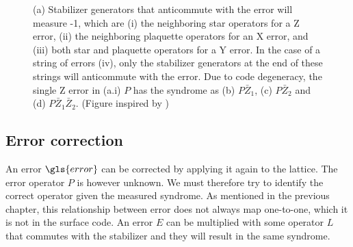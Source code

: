 \begin{figure}
  \hspace{1cm}
  \caption{(a) Stabilizer generators that anticommute with the error will measure -1, which are (i) the neighboring star operators for a Z error, (ii) the neighboring plaquette operators for an X error, and (iii) both star and plaquette operators for a Y error. In the case of a string of errors (iv), only the stabilizer generators at the end of these strings will anticommute with the error. Due to code degeneracy, the single Z error in (a.i) $P$ has the syndrome as (b) $P\bar{Z}_1$, (c) $P\bar{Z}_2$ and (d) $P\bar{Z}_1\bar{Z}_2$. (Figure inspired by \cite{browne})}\label{sf:fig_degenerate}
\end{figure}

\subsection{Error correction}
An error $\gls{error}$ can be corrected by applying it again to the lattice. The error operator $P$ is however unknown. We must therefore try to identify the correct operator given the measured syndrome. As mentioned in the previous chapter, this relationship between error does not always map one-to-one, which it is not in the surface code. An error $E$ can be multiplied with some operator $L$ that commutes with the stabilizer and they will result in the same syndrome.

